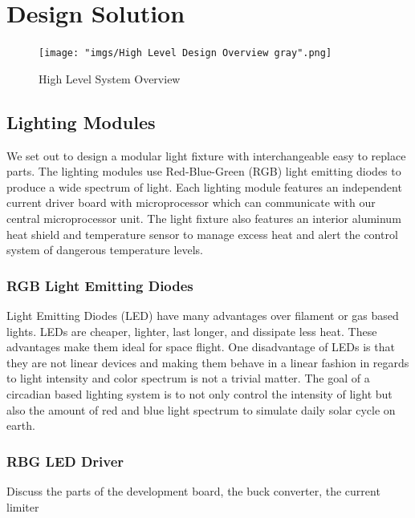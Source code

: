 \documentclass[12pt,a4paper]{report}
\begin{document}
\section{Design Solution}

\begin{figure}[H]
	\centering
	\texttt{[image: "imgs/High Level Design Overview gray".png]}\par			\vspace{0.1cm}
	\caption{High Level System Overview}
\end{figure}
\subsection{Lighting Modules}
We set out to design a modular light fixture with interchangeable easy to replace parts. The lighting modules use Red-Blue-Green (RGB) light emitting diodes to produce a wide spectrum of light. Each lighting module features an independent current driver board with microprocessor which can communicate with our central microprocessor unit. The light fixture also features an interior aluminum heat shield and temperature sensor to manage excess heat and alert the control system of dangerous temperature levels. 
 
\subsubsection{RGB Light Emitting Diodes}
Light Emitting Diodes (LED) have many advantages over filament or gas based lights. LEDs are cheaper, lighter, last longer, and dissipate less heat. These advantages make them ideal for space flight. One disadvantage of LEDs is that they are not linear devices and making them behave in a linear fashion in regards to light intensity and color spectrum is not a trivial matter. The goal of a circadian based lighting system is to not only control the intensity of light but also the amount of red and blue light spectrum to simulate daily solar cycle on earth. 

\subsubsection{RBG LED Driver}
Discuss the parts of the development board, the buck converter, the current limiter
\end{document}
